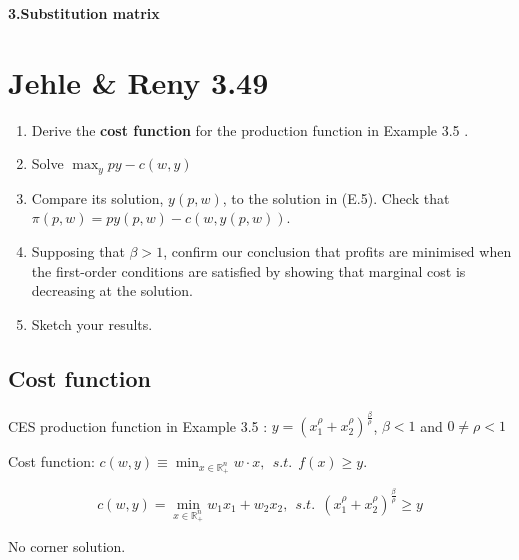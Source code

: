\documentclass{article}
\newcommand{\R}{\mathbb{R}}
\begin{document}
\vspace{3mm}
\textbf{3.Substitution matrix}



\section{Jehle \& Reny 3.49}

\begin{enumerate}
\item Derive the \textbf{cost function} for the production function in Example 3.5 . 

\item Solve $\max_y py - c(w, y)$ 

\item Compare its solution, $y(p,w)$, to the solution in (E.5). Check that $\pi (p,w) = py(p,w) - c(w, y(p,w))$. 

\item Supposing that $\beta > 1$, confirm our conclusion that profits are minimised when the
first-order conditions are satisfied by showing that marginal cost is decreasing at the solution. 

\item Sketch your results.

\end{enumerate}

\subsection{Cost function}

\begin{mdframed}[backgroundcolor=blue!20,linecolor=white]
CES  production function in Example 3.5 : $y = (x_1^\rho + x_2^\rho)^{\frac{\beta}{\rho}}$, $\beta < 1$ and $0 \ne \rho <1$

Cost function: $c(w,y) \equiv \min_{x \in \R^n_+} w \cdot x , \ \ s.t. \ \ f(x) \ge y.$
\end{mdframed}


$$c(w,y) = \min_{x \in \R^n_+} w_1x_1 + w_2x_2 , \ \ s.t. \ \ (x_1^\rho + x_2^\rho)^{\frac{\beta}{\rho}} \ge y$$

No corner solution.
\end{document}
